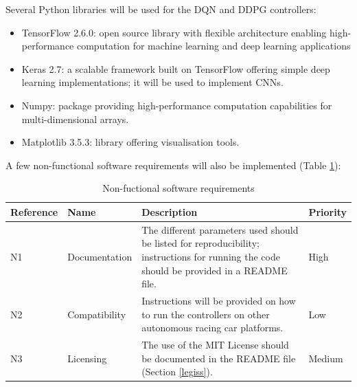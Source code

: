 Several Python libraries will be used for the DQN and DDPG controllers:
\begin{itemize}
	\item TensorFlow 2.6.0: open source library with flexible architecture enabling high-performance computation for machine learning and deep learning applications
	\item Keras 2.7: a scalable framework built on TensorFlow offering simple deep learning implementations; it will be used to implement CNNs.
	\item Numpy: package providing high-performance computation capabilities for multi-dimensional arrays.
	\item Matplotlib 3.5.3: library offering visualisation tools.
\end{itemize}

A few non-functional software requirements will also be implemented (Table \ref{nonfuncsoreqtab}):

\begin{table}[H]
\centering
\begin{tabularx}{\textwidth}{||l|X|X|l||} 
 \hline
 Reference & Name & Description & Priority\\ [0.5ex] 
 \hline\hline
 N1 & Documentation & The different parameters used should be listed for reproducibility; instructions for running the code should be provided in a README file. & High\\
 \hline
 N2 & Compatibility & Instructions will be provided on how to run the controllers on other autonomous racing car platforms. & Low\\
  \hline
 N3 & Licensing & The use of the MIT License should be documented in the README file (Section \ref{legiss}). & Medium\\
  \hline
\end{tabularx}
\caption{Non-fuctional software requirements}
\label{nonfuncsoreqtab}
\end{table}


